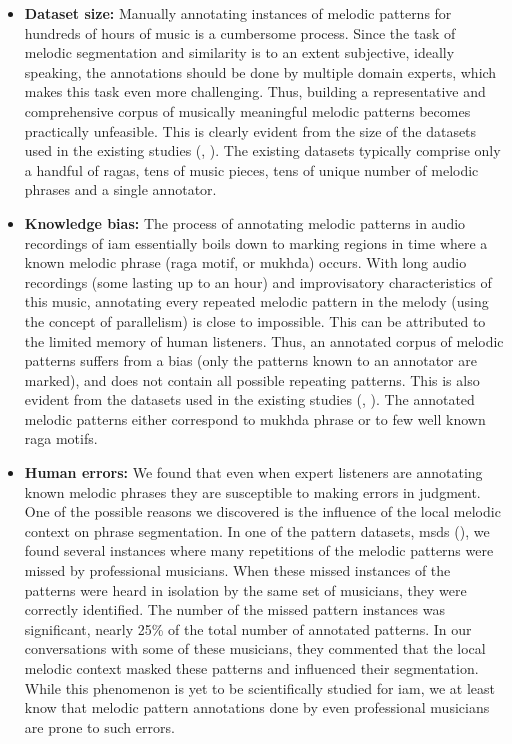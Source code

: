 \begin{itemize}
	\item \textbf{Dataset size:} Manually annotating instances of melodic patterns for hundreds of hours of music is a cumbersome process. Since the task of melodic segmentation and similarity is to an extent subjective, ideally speaking, the annotations should be done by multiple domain experts, which makes this task even more challenging. Thus, building a representative and comprehensive corpus of musically meaningful melodic patterns becomes practically unfeasible. This is clearly evident from the size of the datasets used in the existing studies (, ). The existing datasets typically comprise only a handful of \glspl{raga}, tens of music pieces, tens of unique number of melodic phrases and a single annotator.

	\item \textbf{Knowledge bias:} The process of annotating melodic patterns in audio recordings of \gls{iam} essentially boils down to marking regions in time where a known melodic phrase (\gls{raga} motif, or \gls{mukhda}) occurs. With long audio recordings (some lasting up to an hour) and improvisatory characteristics of this music, annotating every repeated melodic pattern in the melody (using the concept of parallelism) is close to impossible. This can be attributed to the limited memory of human listeners. Thus, an annotated corpus of melodic patterns suffers from a bias (only the patterns known to an annotator are marked), and does not contain all possible repeating patterns. This is also evident from the datasets used in the existing studies (, ). The annotated melodic patterns either correspond to \gls{mukhda} phrase or to few well known \gls{raga} motifs. 
	
	\item \textbf{Human errors:} We found that even when expert listeners are annotating known melodic phrases they are susceptible to making errors in judgment. One of the possible reasons we discovered is the influence of the local melodic context on phrase segmentation. In one of the pattern datasets, \acrshort{msds} (), we found several instances where many repetitions of the melodic patterns were missed by professional musicians. When these missed instances of the patterns were heard in isolation by the same set of musicians, they were correctly identified. The number of the missed pattern instances was significant, nearly 25\% of the total number of annotated patterns. In our conversations with some of these musicians, they commented that the local melodic context masked these patterns and influenced their segmentation. While this phenomenon is yet to be scientifically studied for \gls{iam}, we at least know that melodic pattern annotations done by even professional musicians are prone to such errors. 			
\end{itemize}

